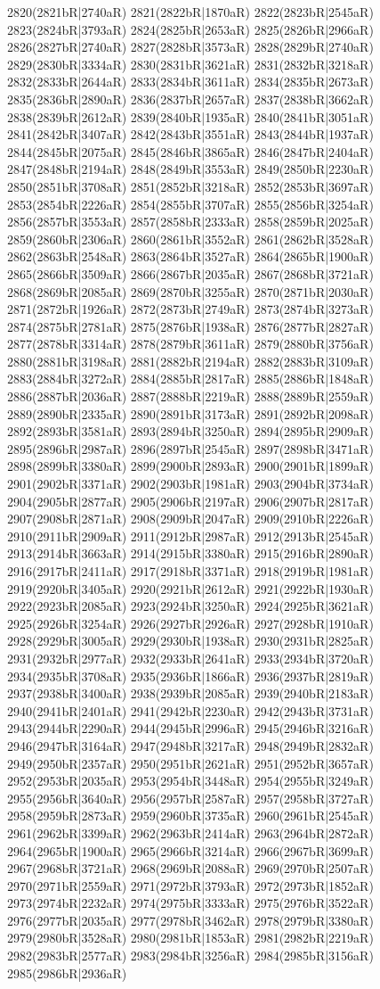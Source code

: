 2820(2821bR|2740aR) 2821(2822bR|1870aR) 2822(2823bR|2545aR) 2823(2824bR|3793aR) 2824(2825bR|2653aR) 2825(2826bR|2966aR) 2826(2827bR|2740aR) 2827(2828bR|3573aR) 2828(2829bR|2740aR) 2829(2830bR|3334aR) 2830(2831bR|3621aR) 2831(2832bR|3218aR) 2832(2833bR|2644aR) 2833(2834bR|3611aR) 2834(2835bR|2673aR) 2835(2836bR|2890aR) 2836(2837bR|2657aR) 2837(2838bR|3662aR) 2838(2839bR|2612aR) 2839(2840bR|1935aR) 2840(2841bR|3051aR) 2841(2842bR|3407aR) 2842(2843bR|3551aR) 2843(2844bR|1937aR) 2844(2845bR|2075aR) 2845(2846bR|3865aR) 2846(2847bR|2404aR) 2847(2848bR|2194aR) 2848(2849bR|3553aR) 2849(2850bR|2230aR) 2850(2851bR|3708aR) 2851(2852bR|3218aR) 2852(2853bR|3697aR) 2853(2854bR|2226aR) 2854(2855bR|3707aR) 2855(2856bR|3254aR) 2856(2857bR|3553aR) 2857(2858bR|2333aR) 2858(2859bR|2025aR) 2859(2860bR|2306aR) 2860(2861bR|3552aR) 2861(2862bR|3528aR) 2862(2863bR|2548aR) 2863(2864bR|3527aR) 2864(2865bR|1900aR) 2865(2866bR|3509aR) 2866(2867bR|2035aR) 2867(2868bR|3721aR) 2868(2869bR|2085aR) 2869(2870bR|3255aR) 2870(2871bR|2030aR) 2871(2872bR|1926aR) 2872(2873bR|2749aR) 2873(2874bR|3273aR) 2874(2875bR|2781aR) 2875(2876bR|1938aR) 2876(2877bR|2827aR) 2877(2878bR|3314aR) 2878(2879bR|3611aR) 2879(2880bR|3756aR) 2880(2881bR|3198aR) 2881(2882bR|2194aR) 2882(2883bR|3109aR) 2883(2884bR|3272aR) 2884(2885bR|2817aR) 2885(2886bR|1848aR) 2886(2887bR|2036aR) 2887(2888bR|2219aR) 2888(2889bR|2559aR) 2889(2890bR|2335aR) 2890(2891bR|3173aR) 2891(2892bR|2098aR) 2892(2893bR|3581aR) 2893(2894bR|3250aR) 2894(2895bR|2909aR) 2895(2896bR|2987aR) 2896(2897bR|2545aR) 2897(2898bR|3471aR) 2898(2899bR|3380aR) 2899(2900bR|2893aR) 2900(2901bR|1899aR) 2901(2902bR|3371aR) 2902(2903bR|1981aR) 2903(2904bR|3734aR) 2904(2905bR|2877aR) 2905(2906bR|2197aR) 2906(2907bR|2817aR) 2907(2908bR|2871aR) 2908(2909bR|2047aR) 2909(2910bR|2226aR) 2910(2911bR|2909aR) 2911(2912bR|2987aR) 2912(2913bR|2545aR) 2913(2914bR|3663aR) 2914(2915bR|3380aR) 2915(2916bR|2890aR) 2916(2917bR|2411aR) 2917(2918bR|3371aR) 2918(2919bR|1981aR) 2919(2920bR|3405aR) 2920(2921bR|2612aR) 2921(2922bR|1930aR) 2922(2923bR|2085aR) 2923(2924bR|3250aR) 2924(2925bR|3621aR) 2925(2926bR|3254aR) 2926(2927bR|2926aR) 2927(2928bR|1910aR) 2928(2929bR|3005aR) 2929(2930bR|1938aR) 2930(2931bR|2825aR) 2931(2932bR|2977aR) 2932(2933bR|2641aR) 2933(2934bR|3720aR) 2934(2935bR|3708aR) 2935(2936bR|1866aR) 2936(2937bR|2819aR) 2937(2938bR|3400aR) 2938(2939bR|2085aR) 2939(2940bR|2183aR) 2940(2941bR|2401aR) 2941(2942bR|2230aR) 2942(2943bR|3731aR) 2943(2944bR|2290aR) 2944(2945bR|2996aR) 2945(2946bR|3216aR) 2946(2947bR|3164aR) 2947(2948bR|3217aR) 2948(2949bR|2832aR) 2949(2950bR|2357aR) 2950(2951bR|2621aR) 2951(2952bR|3657aR) 2952(2953bR|2035aR) 2953(2954bR|3448aR) 2954(2955bR|3249aR) 2955(2956bR|3640aR) 2956(2957bR|2587aR) 2957(2958bR|3727aR) 2958(2959bR|2873aR) 2959(2960bR|3735aR) 2960(2961bR|2545aR) 2961(2962bR|3399aR) 2962(2963bR|2414aR) 2963(2964bR|2872aR) 2964(2965bR|1900aR) 2965(2966bR|3214aR) 2966(2967bR|3699aR) 2967(2968bR|3721aR) 2968(2969bR|2088aR) 2969(2970bR|2507aR) 2970(2971bR|2559aR) 2971(2972bR|3793aR) 2972(2973bR|1852aR) 2973(2974bR|2232aR) 2974(2975bR|3333aR) 2975(2976bR|3522aR) 2976(2977bR|2035aR) 2977(2978bR|3462aR) 2978(2979bR|3380aR) 2979(2980bR|3528aR) 2980(2981bR|1853aR) 2981(2982bR|2219aR) 2982(2983bR|2577aR) 2983(2984bR|3256aR) 2984(2985bR|3156aR) 2985(2986bR|2936aR) 